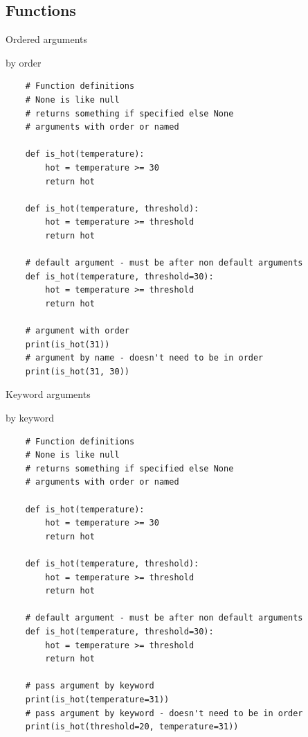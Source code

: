 \documentclass{bredelebeamer}
\begin{document}
\subsection{Functions}
\begin{frame}[fragile]{Ordered arguments}
  \begin{exampleblock}{by order}
    \begin{lstlisting}
    # Function definitions
    # None is like null
    # returns something if specified else None
    # arguments with order or named
    
    def is_hot(temperature):
        hot = temperature >= 30
        return hot
        
    def is_hot(temperature, threshold):
        hot = temperature >= threshold
        return hot
    
    # default argument - must be after non default arguments
    def is_hot(temperature, threshold=30):
        hot = temperature >= threshold
        return hot
        
    # argument with order
    print(is_hot(31))
    # argument by name - doesn't need to be in order
    print(is_hot(31, 30))
    \end{lstlisting}
  \end{exampleblock}
\end{frame}

\begin{frame}[fragile]{Keyword arguments}
  \begin{exampleblock}{by keyword}
    \begin{lstlisting}
    # Function definitions
    # None is like null
    # returns something if specified else None
    # arguments with order or named
    
    def is_hot(temperature):
        hot = temperature >= 30
        return hot
        
    def is_hot(temperature, threshold):
        hot = temperature >= threshold
        return hot
    
    # default argument - must be after non default arguments
    def is_hot(temperature, threshold=30):
        hot = temperature >= threshold
        return hot
        
    # pass argument by keyword
    print(is_hot(temperature=31))
    # pass argument by keyword - doesn't need to be in order
    print(is_hot(threshold=20, temperature=31))
    \end{lstlisting}
  \end{exampleblock}
\end{frame}
\end{document}
